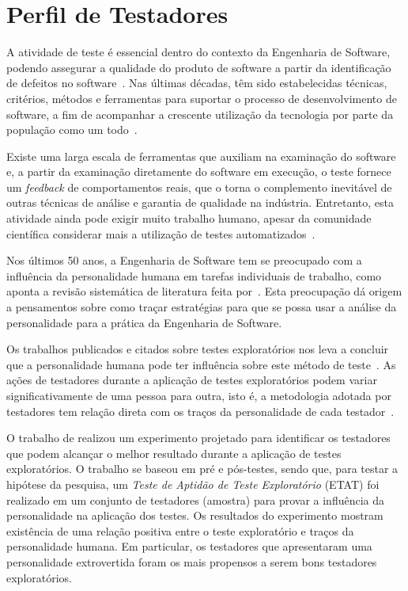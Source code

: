 \section{Perfil de Testadores}
\label{sec:perfil_testadores}


A atividade de teste é essencial dentro do contexto da Engenharia de Software, podendo assegurar a qualidade do produto de software a partir da identificação de defeitos no software~\cite{myers2004art}. Nas últimas décadas, têm sido estabelecidas técnicas, critérios, métodos
e ferramentas para suportar o processo de desenvolvimento de software, a fim de acompanhar a crescente utilização da tecnologia por parte da população como um todo~\cite{maldonado2004introduccao}.

Existe uma larga escala de ferramentas que auxiliam na examinação do software e, a partir da examinação diretamente do software em execução, o teste fornece um \textit{feedback} de comportamentos reais, que o torna o complemento inevitável de outras técnicas de análise e garantia de qualidade na indústria. Entretanto, esta atividade ainda pode exigir muito trabalho humano, apesar da comunidade científica considerar mais a utilização de testes automatizados~\cite{bertolino2007software}.

Nos últimos 50 anos, a Engenharia de Software tem se preocupado com a influência da personalidade humana em tarefas individuais de trabalho, como aponta a revisão sistemática de literatura feita por~\cite{cruz2011personality}. Esta preocupação dá origem a pensamentos sobre como traçar estratégias para que se possa usar a análise da personalidade para a prática da Engenharia de Software. 

Os trabalhos publicados e citados sobre testes exploratórios nos leva a concluir que a personalidade humana pode ter influência sobre este método de teste~\cite{bach2003exploratory, whittaker2009exploratory, itkonen2015test, itkonen2012role, shoaib2009empirical}. As ações de testadores durante a aplicação de testes exploratórios podem variar significativamente de uma pessoa para outra, isto é, a metodologia adotada por testadores tem relação direta com os traços da personalidade de cada testador~\cite{shoaib2009empirical}. 

O trabalho de \cite{shoaib2009empirical} realizou um experimento projetado para identificar os testadores que podem alcançar o melhor resultado durante a aplicação de testes exploratórios. O trabalho se baseou em pré e pós-testes, sendo que, para testar a hipótese da pesquisa, um \textit{Teste de Aptidão de Teste Exploratório} (ETAT) foi realizado em um conjunto de testadores (amostra) para provar a influência da personalidade na aplicação dos testes. Os resultados do experimento mostram existência de uma relação positiva entre o teste exploratório e traços da personalidade humana. Em particular, os testadores que apresentaram uma personalidade extrovertida foram os mais propensos a serem bons testadores exploratórios.

